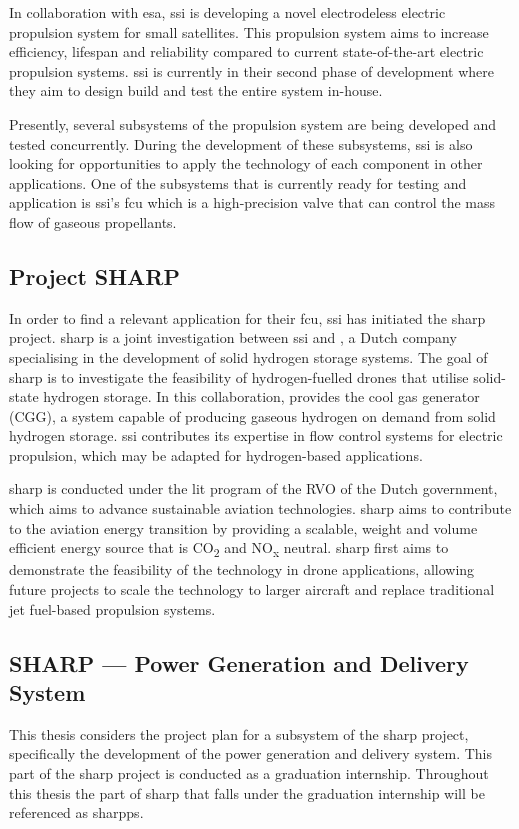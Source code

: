 In collaboration with \gls{esa}, \gls{ssi} is developing a novel electrodeless electric propulsion system for small satellites.
This propulsion system aims to increase efficiency, lifespan and reliability compared to current state-of-the-art electric propulsion systems.
\gls{ssi} is currently in their second phase of development where they aim to design build and test the entire system in-house.

Presently, several subsystems of the propulsion system are being developed and tested concurrently.
During the development of these subsystems, \gls{ssi} is also looking for opportunities to apply the technology of each component in other applications.
One of the subsystems that is currently ready for testing and application is \gls{ssi}'s \gls{fcu} which is a high-precision valve that can control the mass flow of gaseous propellants.


\subsection*{Project SHARP}
In order to find a relevant application for their \gls{fcu}, \gls{ssi} has initiated the \gls{sharp} project.
\gls{sharp} is a joint investigation between \gls{ssi} and , a Dutch company specialising in the development of solid hydrogen storage systems.
The goal of \gls{sharp} is to investigate the feasibility of hydrogen-fuelled drones that utilise solid-state hydrogen storage.
In this collaboration,  provides the cool gas generator (CGG), a system capable of producing gaseous hydrogen on demand from solid hydrogen storage.
\gls{ssi} contributes its expertise in flow control systems for electric propulsion, which may be adapted for hydrogen-based applications.

\gls{sharp} is conducted under the \gls{lit} program of the RVO of the Dutch government, which aims to advance sustainable aviation technologies. \gls{sharp} aims to contribute to the aviation energy transition by providing a scalable, weight and volume efficient energy source that is CO\textsubscript{2} and NO\textsubscript{x} neutral. \gls{sharp} first aims to demonstrate the feasibility of the technology in drone applications, allowing future projects to scale the technology to larger aircraft and replace traditional jet fuel-based propulsion systems.

\subsection*{SHARP --- Power Generation and Delivery System}
This thesis considers the project plan for a subsystem of the \gls{sharp} project, specifically the development of the power generation and delivery system. This part of the \gls{sharp} project is conducted as a graduation internship. Throughout this thesis the part of \gls{sharp} that falls under the graduation internship will be referenced as \gls{sharpps}.

\newpage
